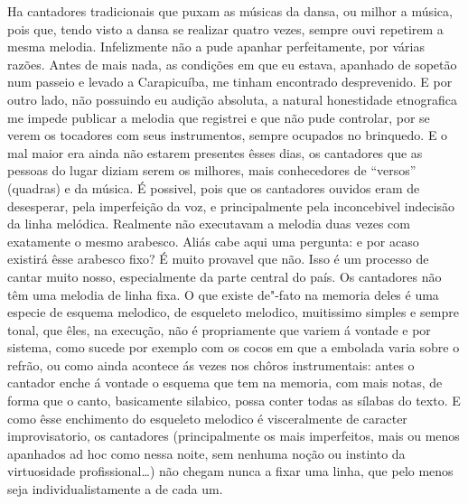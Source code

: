 Ha cantadores tradicionais que puxam as músicas da dansa, ou milhor a
música, pois que, tendo visto a dansa se realizar quatro vezes, sempre
ouvi repetirem a mesma melodia. Infelizmente não a pude apanhar
perfeitamente, por várias razões. Antes de mais nada, as condições em
que eu estava, apanhado de sopetão num passeio e levado a Carapicuíba,
me tinham encontrado desprevenido. E por outro lado, não possuindo eu
audição absoluta, a natural honestidade etnografica me impede publicar a
melodia que registrei e que não pude controlar, por se verem os
tocadores com seus instrumentos, sempre ocupados no brinquedo. E o mal
maior era ainda não estarem presentes êsses dias, os cantadores que as
pessoas do lugar diziam serem os milhores, mais conhecedores de
``versos'' (quadras) e da música. É possivel, pois que os cantadores
ouvidos eram de desesperar, pela imperfeição da voz, e principalmente
pela inconcebivel indecisão da linha melódica. Realmente não executavam
a melodia duas vezes com exatamente o mesmo arabesco. Aliás cabe aqui
uma pergunta: e por acaso existirá êsse arabesco fixo? É muito provavel
que não. Isso é um processo de cantar muito nosso, especialmente da
parte central do país. Os cantadores não têm uma melodia de linha fixa.
O que existe de"-fato na memoria deles é uma especie de esquema melodico,
de esqueleto melodico, muitissimo simples e sempre tonal, que êles, na
execução, não é propriamente que variem á vontade e por sistema, como
sucede por exemplo com os cocos em que a embolada varia sobre o refrão,
ou como ainda acontece ás vezes nos chôros instrumentais: antes o
cantador enche á vontade o esquema que tem na memoria, com mais notas,
de forma que o canto, basicamente silabico, possa conter todas as
sílabas do texto. E como êsse enchimento do esqueleto melodico é
visceralmente de caracter improvisatorio, os cantadores (principalmente
os mais imperfeitos, mais ou menos apanhados ad hoc como nessa noite,
sem nenhuma noção ou instinto da virtuosidade profissional\ldots{}) não
chegam nunca a fixar uma linha, que pelo menos seja individualistamente
a de cada um.

